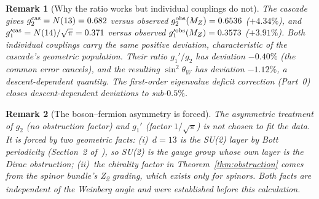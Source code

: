 \documentclass[12pt,a4paper]{article}
\newtheorem*{remark}{Remark}
\begin{document}
\begin{remark}[Why the ratio works but individual couplings do not]
The cascade gives $g_2^{\rm cas} = N(13) = 0.682$ versus observed
$g_2^{\rm obs}(M_Z) = 0.6536$ ($+4.34\%$), and
$g_1'^{\rm cas} = N(14)/\sqrt{\pi} = 0.371$ versus observed
$g_1'^{\rm obs}(M_Z) = 0.3573$ ($+3.91\%$). Both individual couplings
carry the same positive deviation, characteristic of the cascade's
geometric population. Their ratio $g_1'/g_2$ has deviation $-0.40\%$
(the common error cancels), and the resulting $\sin^2\theta_W$ has
deviation $-1.12\%$, a descent-dependent quantity. The first-order
eigenvalue deficit correction (Part~0) closes
descent-dependent deviations to sub-$0.5\%$.
\end{remark}

\begin{remark}[The boson--fermion asymmetry is forced]
The asymmetric treatment of $g_2$ (no obstruction factor) and
$g_1'$ (factor $1/\sqrt{\pi}$) is not chosen to fit the data. It is
forced by two geometric facts: (i)~$d=13$ is the SU(2) layer
\emph{by Bott periodicity} (Section~2 of~\cite{part4a}), so SU(2) is
the gauge group whose own layer is the Dirac obstruction; (ii)~the
chirality factor in Theorem~\ref{thm:obstruction} comes from the
spinor bundle's Z\textsubscript{2} grading, which exists only for
spinors. Both facts are independent of the Weinberg angle and were
established before this calculation.
\end{remark}
\end{document}
